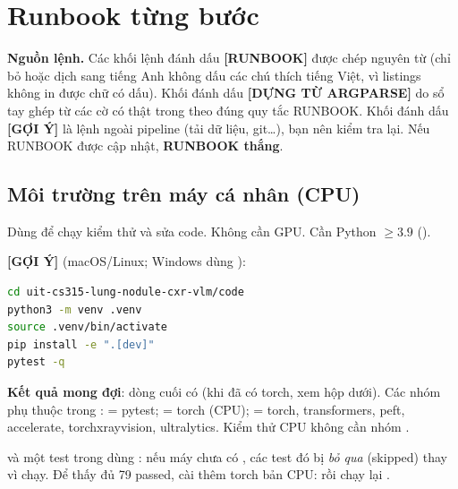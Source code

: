 \section{Runbook từng bước}
\label{sec:runbook}

\begin{keybox}
\textbf{Nguồn lệnh.} Các khối lệnh đánh dấu \textbf{[RUNBOOK]} được chép nguyên từ 
(chỉ bỏ hoặc dịch sang tiếng Anh không dấu các chú thích tiếng Việt, vì listings không in được chữ có dấu).
Khối đánh dấu \textbf{[DỰNG TỪ ARGPARSE]} do sổ tay ghép từ các cờ có thật trong  theo đúng quy tắc RUNBOOK.
Khối đánh dấu \textbf{[GỢI Ý]} là lệnh ngoài pipeline (tải dữ liệu, git\ldots), bạn nên kiểm tra lại.
Nếu RUNBOOK được cập nhật, \textbf{RUNBOOK thắng}.
\end{keybox}

\subsection{Môi trường trên máy cá nhân (CPU)}
\label{sec:env-local}

Dùng để chạy kiểm thử và sửa code. Không cần GPU. Cần Python $\ge 3.9$ ().

\textbf{[GỢI Ý]} (macOS/Linux; Windows dùng ):
\begin{lstlisting}[language=bash]
cd uit-cs315-lung-nodule-cxr-vlm/code
python3 -m venv .venv
source .venv/bin/activate
pip install -e ".[dev]"
pytest -q
\end{lstlisting}

\textbf{Kết quả mong đợi}: dòng cuối có  (khi đã có torch, xem hộp dưới). Các nhóm phụ thuộc trong :
 = pytest;  = torch (CPU);  = torch, transformers, peft, accelerate, torchxrayvision, ultralytics.
Kiểm thử CPU không cần nhóm .

\begin{warnbox}
 và một test trong  dùng : nếu máy chưa có ,
các test đó bị \emph{bỏ qua} (skipped) thay vì chạy. Để thấy đủ 79 passed, cài thêm torch bản CPU:
 rồi chạy lại .
\end{warnbox}

